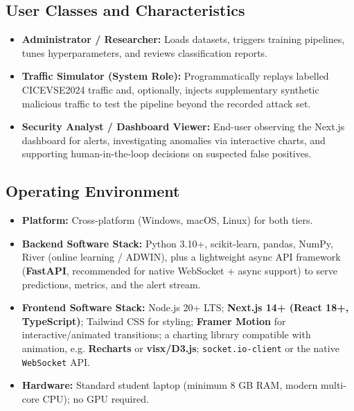 \documentclass[11pt, a4paper]{article}
\begin{document}
\subsection{User Classes and Characteristics}
\begin{itemize}
    \item \textbf{Administrator / Researcher:} Loads datasets, triggers training pipelines, tunes hyperparameters, and reviews classification reports.
    \item \textbf{Traffic Simulator (System Role):} Programmatically replays labelled CICEVSE2024 traffic and, optionally, injects supplementary synthetic malicious traffic to test the pipeline beyond the recorded attack set.
    \item \textbf{Security Analyst / Dashboard Viewer:} End-user observing the Next.js dashboard for alerts, investigating anomalies via interactive charts, and supporting human-in-the-loop decisions on suspected false positives.
\end{itemize}

\subsection{Operating Environment}
\begin{itemize}
    \item \textbf{Platform:} Cross-platform (Windows, macOS, Linux) for both tiers.
    \item \textbf{Backend Software Stack:} Python 3.10+, scikit-learn, pandas, NumPy, River (online learning / ADWIN), plus a lightweight async API framework (\textbf{FastAPI}, recommended for native WebSocket + async support) to serve predictions, metrics, and the alert stream.
    \item \textbf{Frontend Software Stack:} Node.js 20+ LTS; \textbf{Next.js 14+ (React 18+, TypeScript)}; Tailwind CSS for styling; \textbf{Framer Motion} for interactive/animated transitions; a charting library compatible with animation, e.g. \textbf{Recharts} or \textbf{visx/D3.js}; \texttt{socket.io-client} or the native \texttt{WebSocket} API.
    \item \textbf{Hardware:} Standard student laptop (minimum 8 GB RAM, modern multi-core CPU); no GPU required.
\end{itemize}
\end{document}
